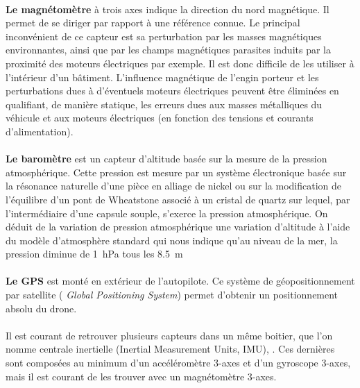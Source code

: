  \paragraph*{}
 \textbf{Le magnétomètre} à trois axes indique la direction du nord magnétique. Il permet de se diriger par rapport à une référence connue. Le principal inconvénient de ce capteur est sa perturbation par les masses magnétiques environnantes, ainsi que par les champs magnétiques parasites induits par la proximité des moteurs électriques par exemple. Il est donc difficile de les utiliser à l'intérieur d'un bâtiment. L'influence magnétique de l'engin porteur et les perturbations dues à d'éventuels moteurs électriques peuvent être éliminées en qualifiant, de manière statique, les erreurs dues aux masses métalliques du véhicule et aux moteurs électriques (en fonction des tensions et courants d'alimentation).

 \paragraph*{}
 { \color{red}
 \textbf{Le baromètre} est un capteur d'altitude basée sur la mesure de la pression atmosphérique. Cette pression est mesure par un système électronique basée sur la résonance naturelle d'une pièce en alliage de nickel ou sur la modification de l'équilibre d'un pont de Wheatstone associé à un cristal de quartz sur lequel, par l'intermédiaire d'une capsule souple, s'exerce la pression atmosphérique. On déduit de la variation de pression atmosphérique une variation d'altitude à l'aide du modèle d'atmosphère standard qui nous indique qu'au niveau de la mer, la pression diminue de \SI{1}{\hecto\pascal} tous les \SI{8.5}{\meter}
 }

 \paragraph*{}
 \textbf{Le GPS} est monté en extérieur de l'autopilote. Ce système de géopositionnement par satellite (\textit{ Global Positioning System})  permet d'obtenir un positionnement absolu du drone. 


 \paragraph*{}
 Il est courant de retrouver plusieurs capteurs dans un même boitier, que l'on nomme centrale inertielle (Inertial Measurement Units, IMU), . Ces dernières sont composées au minimum d'un accéléromètre 3-axes et d'un gyroscope 3-axes, mais il est courant de les trouver avec un magnétomètre 3-axes. 

